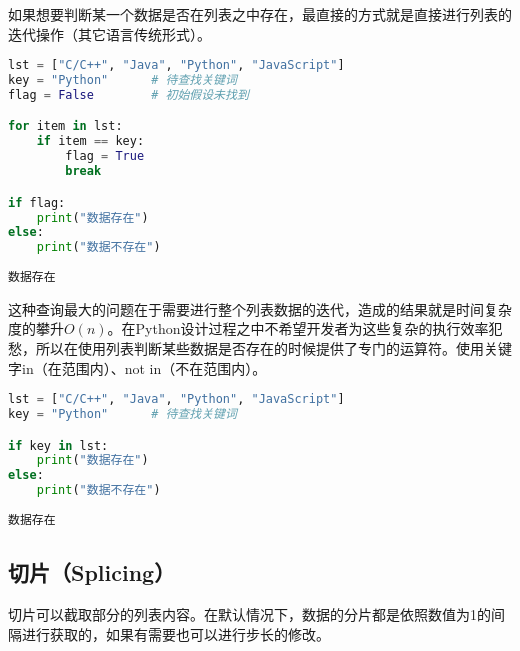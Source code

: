 如果想要判断某一个数据是否在列表之中存在，最直接的方式就是直接进行列表的迭代操作（其它语言传统形式）。\\


\begin{lstlisting}[language=Python]
lst = ["C/C++", "Java", "Python", "JavaScript"]
key = "Python"      # 待查找关键词
flag = False        # 初始假设未找到

for item in lst:
    if item == key:
        flag = True
        break

if flag:
    print("数据存在")
else:
    print("数据不存在")
\end{lstlisting}

\begin{tcolorbox}
	\begin{verbatim}
数据存在
\end{verbatim}
\end{tcolorbox}

这种查询最大的问题在于需要进行整个列表数据的迭代，造成的结果就是时间复杂度的攀升$ O(n) $。在Python设计过程之中不希望开发者为这些复杂的执行效率犯愁，所以在使用列表判断某些数据是否存在的时候提供了专门的运算符。使用关键字in（在范围内）、not in（不在范围内）。\\


\begin{lstlisting}[language=Python]
lst = ["C/C++", "Java", "Python", "JavaScript"]
key = "Python"      # 待查找关键词

if key in lst:
    print("数据存在")
else:
    print("数据不存在")
\end{lstlisting}

\begin{tcolorbox}
	\begin{verbatim}
数据存在
\end{verbatim}
\end{tcolorbox}

\vspace{0.5cm}

\subsection{切片（Splicing）}

切片可以截取部分的列表内容。在默认情况下，数据的分片都是依照数值为1的间隔进行获取的，如果有需要也可以进行步长的修改。\\

